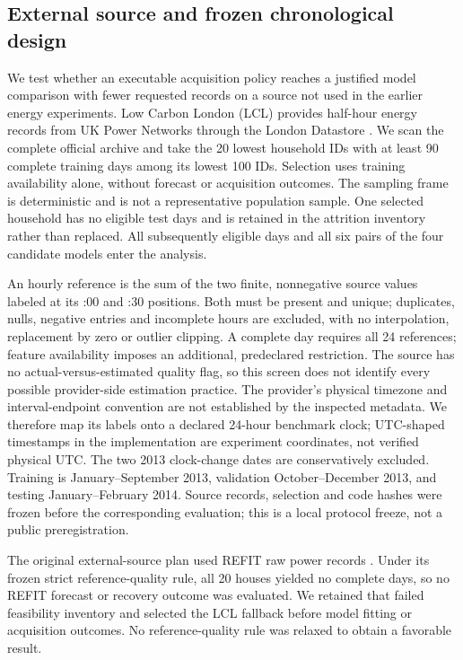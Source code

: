 \subsection{External source and frozen chronological design}\label{sec:external-design}
We test whether an executable acquisition policy reaches a justified model
comparison with fewer requested records on a source not used in the earlier
energy experiments. Low Carbon London (LCL) provides half-hour energy records
from UK Power Networks through the London Datastore \cite{lcl}. We scan the
complete official archive and take the 20 lowest household IDs with at least
90 complete training days among its lowest 100 IDs. Selection uses training
availability alone, without forecast or acquisition outcomes. The sampling
frame is deterministic and is not a representative population sample.
One selected household has no eligible test days and is retained in the
attrition inventory rather than replaced. All subsequently eligible days
and all six pairs of the four candidate models enter the analysis.

An hourly reference is the sum of the two finite, nonnegative source values
labeled at its :00 and :30 positions. Both must be present and unique;
duplicates, nulls, negative entries and incomplete hours are excluded, with
no interpolation, replacement by zero or outlier clipping. A complete day
requires all 24 references; feature availability imposes an additional,
predeclared restriction. The source has no actual-versus-estimated quality
flag, so this screen does not identify every possible provider-side
estimation practice. The provider's physical timezone and interval-endpoint
convention are not established by the inspected metadata. We therefore map
its labels onto a declared 24-hour benchmark clock; UTC-shaped timestamps in
the implementation are experiment coordinates, not verified physical UTC.
The two 2013 clock-change dates are conservatively excluded. Training is
January--September 2013, validation October--December 2013, and testing
January--February 2014. Source records, selection and code hashes were
frozen before the corresponding evaluation; this is a local protocol freeze,
not a public preregistration.

The original external-source plan used REFIT raw power records \cite{refitraw}. Under its
frozen strict reference-quality rule, all 20 houses yielded no complete
days, so no REFIT forecast or recovery outcome was evaluated. We retained
that failed feasibility inventory and selected the LCL fallback before
model fitting or acquisition outcomes. No reference-quality rule was relaxed
to obtain a favorable result.

